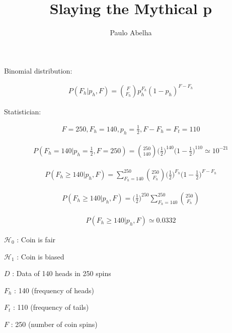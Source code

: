 \documentclass[12pt]{article}
\begin{document}
 

\pagecolor{blogger-black}
\color{white} 
 
\title{Slaying the Mythical p}
\author{Paulo Abelha}
\maketitle

Binomial distribution:

\begin{gather}
P(F_h | p_h, F) = \binom{F}{F_h}p_h^{F_h}(1-p_h)^{F-F_h}
\end{gather}

Statistician:

\begin{gather}
F = 250, F_h = 140, p_h = \frac{1}{2}, F-F_h = F_t = 110
\end{gather}

\begin{gather}
P(F_h = 140 | p_h =\frac{1}{2}, F=250) = \binom{250}{140}\Big(\frac{1}{2}\Big)^{140}\Big(1-\frac{1}{2}\Big)^{110} \simeq 10^{-21}
\end{gather}

\begin{gather}
P(F_h \geq 140 | p_h, F) = \sum_{F_h=140}^{250} \binom{250}{F_h}\Big(\frac{1}{2}\Big)^{F_h}\Big(1-\frac{1}{2}\Big)^{F-F_h}
\end{gather}

\begin{gather}
P(F_h \geq 140 | p_h, F) = \Big(\frac{1}{2}\Big)^{250} \sum_{F_h=140}^{250} \binom{250}{F_h}
\end{gather}

\begin{gather}
P(F_h \geq 140 | p_h, F) \simeq 0.0332
\end{gather}

$\mathcal{H}_0$ : Coin is fair

$\mathcal{H}_1$ : Coin is biased

$D$ : Data of 140 heads in 250 spins

$F_h$ :  140 (frequency of heads)

$F_t$ :  110 (frequency of tails)

$F$ : 250 (number of coin spins)
\end{document}
